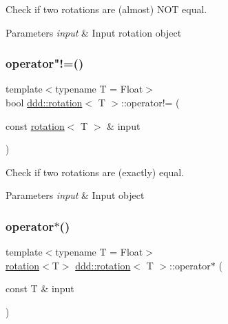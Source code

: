 Check if two rotations are (almost) N\+OT equal. 


\begin{DoxyParams}{Parameters}
{\em input} & Input rotation object \\
\hline
\end{DoxyParams}
\mbox{\label{classddd_1_1rotation_abfeae27a919ada418d2cdcce96e5e08d}} 
\subsubsection{\texorpdfstring{operator"!=()}{operator!=()}}
{\footnotesize\ttfamily template$<$typename T  = Float$>$ \\
bool \hyperlink{classddd_1_1rotation}{ddd\+::rotation}$<$ T $>$\+::operator!= (\begin{DoxyParamCaption}\item[{const \hyperlink{classddd_1_1rotation}{rotation}$<$ T $>$ \&}]{input }\end{DoxyParamCaption})\hspace{0.3cm}{\ttfamily [inline]}}



Check if two rotations are (exactly) equal. 


\begin{DoxyParams}{Parameters}
{\em input} & Input object \\
\hline
\end{DoxyParams}
\mbox{\label{classddd_1_1rotation_aada9691ca7067feefd0a0206f8c8d035}} 
\subsubsection{\texorpdfstring{operator$\ast$()}{operator*()}\hspace{0.1cm}{\footnotesize\ttfamily [1/4]}}
{\footnotesize\ttfamily template$<$typename T  = Float$>$ \\
\hyperlink{classddd_1_1rotation}{rotation}$<$T$>$ \hyperlink{classddd_1_1rotation}{ddd\+::rotation}$<$ T $>$\+::operator$\ast$ (\begin{DoxyParamCaption}\item[{const T \&}]{input }\end{DoxyParamCaption})\hspace{0.3cm}{\ttfamily [inline]}}



